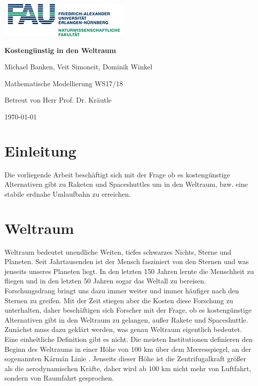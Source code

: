 \documentclass[a4paper, 10pt]{report}
\begin{document}
\begin{titlepage}
\centering
\includegraphics[scale=1]{FAU-nat-logo.png}\par
\vspace{2cm}
{\huge\bfseries Kostengünstig in den Weltraum\par}
\vspace{1cm}
{\Large Michael Banken, Veit Simoneit, Dominik Winkel\par}
\vspace{2cm}
{\Large Mathematische Modellierung WS17/18\par}
\vspace{0.5cm}
{Betreut von Herr Prof. Dr. Kräutle\par}
\vfill
{\Large \today\par}

\end{titlepage}

\tableofcontents


\chapter{Einleitung}


Die vorliegende Arbeit beschäftigt sich mit der Frage ob es kostengünstige Alternativen gibt zu Raketen und Spaceshuttles um in den Weltraum, bzw. eine stabile erdnahe Umlaufbahn zu erreichen.\\
\chapter{Weltraum}

Weltraum bedeutet unendliche Weiten, tiefes schwarzes Nichts, Sterne und Planeten. Seit Jahrtausenden ist der Mensch fasziniert von den Sternen und was jenseits unseres Planeten liegt. In den letzten 150 Jahren lernte die Menschheit zu fliegen und in den letzten 50 Jahren sogar das Weltall zu bereisen. Forschungsdrang bringt uns dazu immer weiter und immer häufiger nach den Sternen zu greifen.
Mit der Zeit stiegen aber die Kosten diese Forschung zu unterhalten, daher beschäftigen sich Forscher mit der Frage, ob es kostengünstige Alternativen gibt in den Weltraum zu gelangen, außer Rakete und Spaceshuttle.\\
Zunächst muss dazu geklärt werden, was genau Weltraum eigentlich bedeutet. Eine einheitliche Definition gibt es nicht. Die meisten Institutionen definieren den Beginn des Weltraums in einer Höhe von 100 km über dem Meeresspiegel, an der sogenannten Kármán Linie \cite[vgl. 2.b)]{fai_weltraum}. Jenseits dieser Höhe ist die Zentrifugalkraft größer als die aerodynamischen Kräfte, daher wird ab 100 km nicht mehr von Luftfahrt, sondern von Raumfahrt gesprochen.
\end{document}
